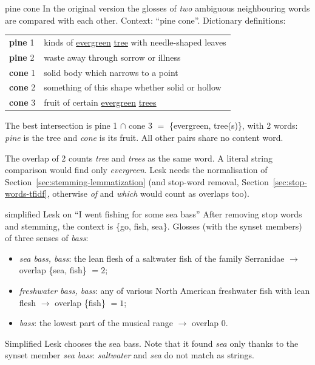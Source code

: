 \begin{nbexample}{pine cone}
In the original version the glosses of \emph{two} ambiguous neighbouring words are
compared with each other. Context: ``pine cone''. Dictionary definitions:
\begin{center}
\small
\begin{tabular}{@{}l l@{}}
\toprule
\textbf{pine} 1 & kinds of \underline{evergreen} \underline{tree} with needle-shaped leaves \\
\textbf{pine} 2 & waste away through sorrow or illness \\
\midrule
\textbf{cone} 1 & solid body which narrows to a point \\
\textbf{cone} 2 & something of this shape whether solid or hollow \\
\textbf{cone} 3 & fruit of certain \underline{evergreen} \underline{trees} \\
\bottomrule
\end{tabular}
\end{center}
The best intersection is pine 1 $\cap$ cone 3 $=$ \{evergreen, tree(s)\}, with 2 words:
\emph{pine} is the tree and \emph{cone} is its fruit. All other pairs share no content
word.
\end{nbexample}

\begin{nbwarning}
The overlap of 2 counts \emph{tree} and \emph{trees} as the same word. A literal string
comparison would find only \emph{evergreen}. Lesk needs the normalisation of
Section~\ref{sec:stemming-lemmatization} (and stop-word removal,
Section~\ref{sec:stop-words-tfidf}, otherwise \emph{of} and \emph{which} would count as
overlaps too).
\end{nbwarning}

\begin{nbexample}{simplified Lesk on ``I went fishing for some sea bass''}
After removing stop words and stemming, the context is \{go, fish, sea\}. Glosses
(with the synset members) of three senses of \emph{bass}:
\begin{itemize}[nosep]
  \item \emph{sea bass, bass}: the lean flesh of a saltwater fish of the family
        Serranidae $\to$ overlap \{sea, fish\} $= 2$;
  \item \emph{freshwater bass, bass}: any of various North American freshwater fish with
        lean flesh $\to$ overlap \{fish\} $= 1$;
  \item \emph{bass}: the lowest part of the musical range $\to$ overlap $0$.
\end{itemize}
Simplified Lesk chooses the sea bass. Note that it found \emph{sea} only thanks to the
synset member \emph{sea bass}: \emph{saltwater} and \emph{sea} do not match as strings.
\end{nbexample}

